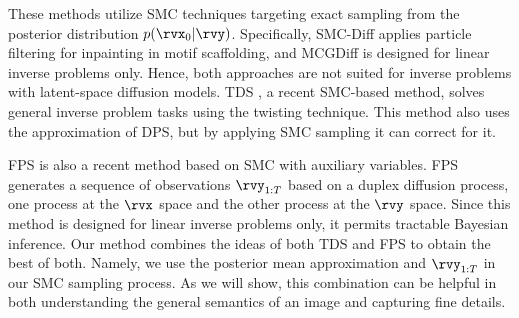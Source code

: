 These methods utilize SMC techniques targeting exact sampling from the posterior distribution $p(\rvx_0 | \rvy)$. Specifically, 
SMC-Diff \cite{trippe2023diffusion} applies particle filtering for inpainting in motif scaffolding, and
MCGDiff \cite{cardoso2023monte} is designed for linear inverse problems only. Hence, both approaches are not suited for inverse problems with latent-space diffusion models. %
TDS \cite{wu2024practical}, a recent SMC-based method, solves general inverse problem tasks using the twisting technique. This method also uses the approximation of DPS, but by applying SMC sampling it can correct for it.


FPS \cite{dou2024diffusion} is also a recent method based on SMC with auxiliary variables. FPS generates a sequence of observations $\rvy_{1:T}$ based on a duplex diffusion process, one process at the $\rvx$ space and the other process at the $\rvy$ space. Since this method is designed for linear inverse problems only, it permits tractable Bayesian inference. Our method combines the ideas of both TDS and FPS to obtain the best of both. Namely, we use the posterior mean approximation and $\rvy_{1:T}$ in our SMC sampling process. As we will show, this combination can be helpful in both understanding the general semantics of an image and capturing fine details. 



